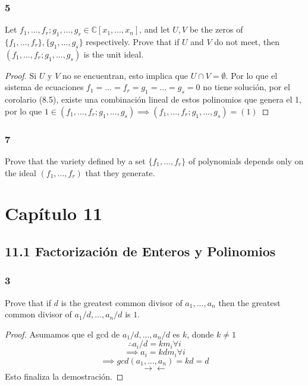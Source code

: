 \documentclass[11pt]{article}
\newcommand{\set}[1]{\mathbb{#1}}
\newcommand{\contr}{\rightarrow\leftarrow}
\theoremstyle{definition}
\begin{document}
        \subsubsection{5}
        Let $f_1,...,f_r;g_1,...,g_r\in\set{C}[x_1,...,x_n]$, and let $U,V$ be the zeros of $\{f_1,...,f_r\},\{g_1,...,g_s\}$ respectively. Prove that if $U$ and $V$ do not meet, then $(f_1,...,f_r;g_1,...,g_s)$ is the unit ideal.
        \begin{proof}
            Si $U$ y $V$ no se encuentran, esto implica que $U\cap V=\emptyset$. Por lo que el sistema de ecuaciones $f_1=...=f_r=g_1=...=g_s=0$ no tiene solución, por el corolario (8.5), existe una combinación lineal de estos polinomios que genera el 1, por lo que $1\in(f_1,...,f_r;g_1,...,g_s)\implies (f_1,...,f_r;g_1,...,g_s)=(1)$
        \end{proof}

        \subsubsection{7}
        Prove that the variety defined by a set $\{f_1,...,f_r\}$ of polynomials depends only on the ideal $(f_1,...,f_r)$ that they generate.

        \section{Capítulo 11}
        \subsection{11.1 Factorización de Enteros y Polinomios}
        \subsubsection{3}
        Prove that if $d$ is the greatest common divisor of $a_1,...,a_n$ then the greatest common divisor of $a_1/d,...,a_n/d$ is $1$.
        \begin{proof}
            Asumamos que el gcd de $a_1/d,...,a_n/d$ es $k$, donde $k\neq 1$
            \[\therefore a_i/d=km_i\forall i\]
            \[\implies a_i=kdm_i\forall i\]
            \[\implies gcd(a_1,...,a_n)=kd=d\]
            \[\contr\]
            Esto finaliza la demostración.
        \end{proof}
\end{document}

